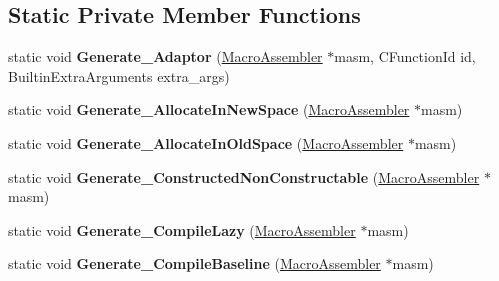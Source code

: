 \subsection*{Static Private Member Functions}
\begin{DoxyCompactItemize}
\item 
static void {\bfseries Generate\+\_\+\+Adaptor} (\hyperlink{classv8_1_1internal_1_1_macro_assembler}{Macro\+Assembler} $\ast$masm, C\+Function\+Id id, Builtin\+Extra\+Arguments extra\+\_\+args)\hypertarget{classv8_1_1internal_1_1_builtins_a205a3a4b5a52fb56af27112d9e95eb90}{}\label{classv8_1_1internal_1_1_builtins_a205a3a4b5a52fb56af27112d9e95eb90}

\item 
static void {\bfseries Generate\+\_\+\+Allocate\+In\+New\+Space} (\hyperlink{classv8_1_1internal_1_1_macro_assembler}{Macro\+Assembler} $\ast$masm)\hypertarget{classv8_1_1internal_1_1_builtins_a071c812c7232f912ac576adef85d9de5}{}\label{classv8_1_1internal_1_1_builtins_a071c812c7232f912ac576adef85d9de5}

\item 
static void {\bfseries Generate\+\_\+\+Allocate\+In\+Old\+Space} (\hyperlink{classv8_1_1internal_1_1_macro_assembler}{Macro\+Assembler} $\ast$masm)\hypertarget{classv8_1_1internal_1_1_builtins_ac63cee2064dc183e4a3c59437757b7a8}{}\label{classv8_1_1internal_1_1_builtins_ac63cee2064dc183e4a3c59437757b7a8}

\item 
static void {\bfseries Generate\+\_\+\+Constructed\+Non\+Constructable} (\hyperlink{classv8_1_1internal_1_1_macro_assembler}{Macro\+Assembler} $\ast$masm)\hypertarget{classv8_1_1internal_1_1_builtins_a9a5063913fd8d34304a36cdf3ef185b0}{}\label{classv8_1_1internal_1_1_builtins_a9a5063913fd8d34304a36cdf3ef185b0}

\item 
static void {\bfseries Generate\+\_\+\+Compile\+Lazy} (\hyperlink{classv8_1_1internal_1_1_macro_assembler}{Macro\+Assembler} $\ast$masm)\hypertarget{classv8_1_1internal_1_1_builtins_a2ce3d3562f55e0e3c8778d5d665b0932}{}\label{classv8_1_1internal_1_1_builtins_a2ce3d3562f55e0e3c8778d5d665b0932}

\item 
static void {\bfseries Generate\+\_\+\+Compile\+Baseline} (\hyperlink{classv8_1_1internal_1_1_macro_assembler}{Macro\+Assembler} $\ast$masm)\hypertarget{classv8_1_1internal_1_1_builtins_a956826f16a7d033c4e29696c7ee11ce6}{}\label{classv8_1_1internal_1_1_builtins_a956826f16a7d033c4e29696c7ee11ce6}


\end{DoxyCompactItemize}
